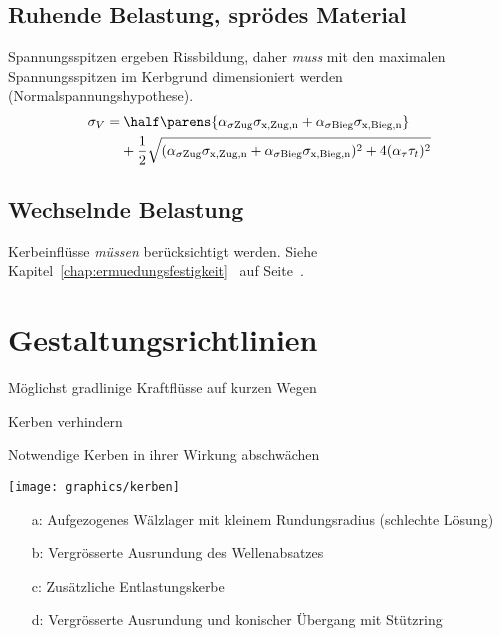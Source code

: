 	\subsection{Ruhende Belastung, sprödes Material} %
		Spannungsspitzen ergeben Rissbildung, daher \emph{muss} mit den maximalen Spannungsspitzen im Kerbgrund dimensioniert werden (Normalspannungshypothese).
		\begin{align*}
			\sigma_V =&\: \half  \parens{\alpha_{\sigma\text{Zug}}\sigma_{\text{x,Zug,n}} + \alpha_{\sigma\text{Bieg}}\sigma_{\text{x,Bieg,n}}} \\
			&+ \frac{1}{2}\sqrt{(\alpha_{\sigma\text{Zug}}\sigma_{\text{x,Zug,n}} + \alpha_{\sigma\text{Bieg}}\sigma_{\text{x,Bieg,n}})^2+4(\alpha_{\tau}\tau_t)^2}
		\end{align*}
	\subsection{Wechselnde Belastung} %
		Kerbeinflüsse \emph{müssen} berücksichtigt werden. Siehe Kapitel~\ref{chap:ermuedungsfestigkeit}~ auf Seite~\pageref{chap:ermuedungsfestigkeit}.
\section{Gestaltungsrichtlinien} %
	\begin{tightitemize}
		\item Möglichst gradlinige Kraftflüsse auf kurzen Wegen
		\item Kerben verhindern
		\item Notwendige Kerben in ihrer Wirkung abschwächen
	\end{tightitemize}
	
	\texttt{[image: graphics/kerben]}
	\begin{itemize}
		\item[a:] Aufgezogenes Wälzlager mit kleinem Rundungsradius (schlechte Lösung)
		\item[b:] Vergrösserte Ausrundung des Wellenabsatzes
		\item[c:] Zusätzliche Entlastungskerbe
		\item[d:] Vergrösserte Ausrundung und konischer Übergang mit Stützring
	\end{itemize}
